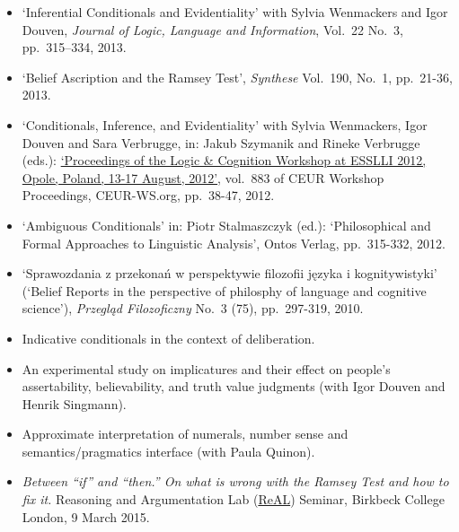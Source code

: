 \documentclass[a4paper,12pt]{article}
\begin{document}
\begin{small}
\begin{itemize}
   \item `Inferential Conditionals and Evidentiality' with Sylvia
    Wenmackers and Igor Douven, \emph{Journal of Logic, Language and Information}, Vol.~22 No.~3, pp.~315–334, 2013.

  \item `Belief Ascription and the Ramsey Test', \emph{Synthese}
    Vol.~190, No.~1, pp.~21-36, 2013. %

  \item `Conditionals, Inference, and Evidentiality' with Sylvia
    Wenmackers, Igor Douven and Sara Verbrugge, in: Jakub Szymanik and
    Rineke Verbrugge (eds.):
    \href{http://ceur-ws.org/Vol-883/}{`Proceedings of the Logic \&
      Cognition Workshop at ESSLLI 2012, Opole, Poland, 13-17 August,
      2012'}, vol.~883 of CEUR Workshop Proceedings, CEUR-WS.org,
    pp.~38-47, 2012.

  \item `Ambiguous Conditionals' in: Piotr Stalmaszczyk (ed.):
    `Philosophical and Formal Approaches to Linguistic Analysis',
    Ontos Verlag, pp.~315-332, 2012.

  \item `Sprawozdania z przekonań w perspektywie filozofii języka i
    kognitywistyki' (`Belief Reports in the perspective of philosphy
    of language and cognitive science'), \emph{Przegląd Filozoficzny}
    No.~3 (75), pp.~297-319, 2010.

  \end{itemize}

  \begin{itemize}
   \item Indicative conditionals in the context of deliberation.
   \item An experimental study on implicatures and their effect on people's assertability, believability, and truth value judgments (with Igor Douven and Henrik Singmann).
   \item Approximate interpretation of numerals, number sense and semantics/pragmatics interface (with Paula Quinon).
  \end{itemize}
  

  \begin{itemize}
  \item \emph{Between ``if'' and ``then.'' On what is wrong with the Ramsey Test and how to fix it.} Reasoning and Argumentation Lab (\href{http://www.bbk.ac.uk/psychology/ral}{ReAL}) Seminar, Birkbeck College London, 9 March 2015.


\end{itemize}
\end{small}
\end{document}

